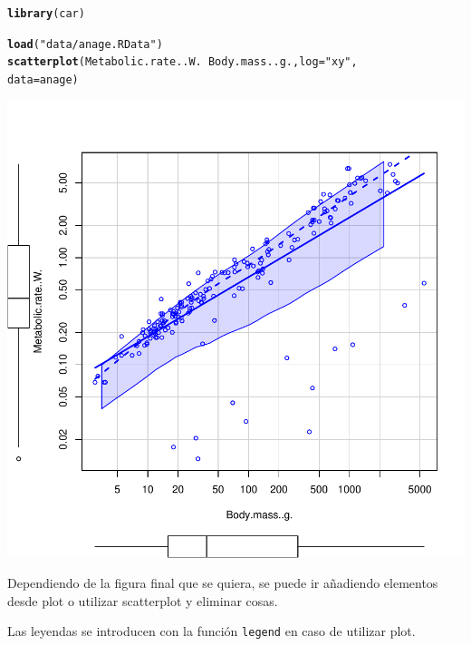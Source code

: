 \documentclass{config/apuntes}\usepackage[]{graphicx}\usepackage[]{xcolor}
\makeatletter
\def\maxwidth{ %
  \ifdim\Gin@nat@width>\linewidth
    \linewidth
  \else
    \Gin@nat@width
  \fi
}
\newcommand{\hlsng}[1]{\textcolor[rgb]{0.192,0.494,0.8}{#1}}%
\newcommand{\hlopt}[1]{\textcolor[rgb]{0,0,0}{#1}}%
\newcommand{\hldef}[1]{\textcolor[rgb]{0.345,0.345,0.345}{#1}}%
\newcommand{\hlkwc}[1]{\textcolor[rgb]{0.333,0.667,0.333}{#1}}%
\newcommand{\hlkwd}[1]{\textcolor[rgb]{0.737,0.353,0.396}{\textbf{#1}}}%
\newenvironment{kframe}{%
 \def\at@end@of@kframe{}%
 \ifinner\ifhmode%
  \def\at@end@of@kframe{\end{minipage}}%
  \begin{minipage}{\columnwidth}%
 \fi\fi%
 \def\FrameCommand##1{\hskip\@totalleftmargin \hskip-\fboxsep
 \colorbox{shadecolor}{##1}\hskip-\fboxsep
     \hskip-\linewidth \hskip-\@totalleftmargin \hskip\columnwidth}%
 \MakeFramed {\advance\hsize-\width
   \@totalleftmargin\z@ \linewidth\hsize
   \@setminipage}}%
 {\par\unskip\endMakeFramed%
 \at@end@of@kframe}
\newenvironment{knitrout}{}{} %
\newcommand{\code}[1]{\texttt{#1}}
\makeatother
\begin{document}
\begin{knitrout}
\color{fgcolor}\begin{kframe}
\begin{alltt}
\hlkwd{library}\hldef{(car)}
\end{alltt}


{\ttfamily\noindent\itshape\color{messagecolor}{\#\# Cargando paquete requerido: carData}}\begin{alltt}
\hlkwd{load}\hldef{(}\hlsng{"data/anage.RData"}\hldef{)}
\hlkwd{scatterplot}\hldef{(Metabolic.rate..W.} \hlopt{~} \hldef{Body.mass..g.,} \hlkwc{log}\hldef{=}\hlsng{"xy"}\hldef{,}
            \hlkwc{data} \hldef{= anage)}
\end{alltt}
\end{kframe}
\includegraphics[width=\maxwidth]{figure/mrateplotx1-1} 
\end{knitrout}

Dependiendo de la figura final que se quiera, se puede ir añadiendo elementos desde plot o utilizar scatterplot y eliminar cosas.

Las leyendas se introducen con la función \code{legend} en caso de utilizar plot.
\end{document}
